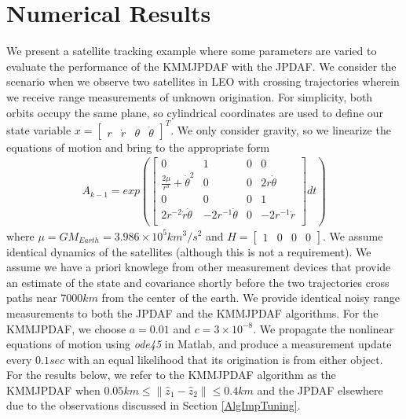 \documentclass[letterpaper, 10pt, conference]{ieeeconf}
\newcommand{\norm}[1]{\ensuremath{\left\| #1 \right\|}}
\begin{document}

\section{Numerical Results}
\label{NumRes}
We present a satellite tracking example where some parameters are varied to evaluate the performance of the KMMJPDAF with the JPDAF. We consider the scenario when we observe two satellites in LEO with crossing trajectories wherein we receive range measurements of unknown origination. For simplicity, both orbits occupy the same plane, so cylindrical coordinates are used to define our state variable $x=\begin{bmatrix} r & \dot r & \theta & \dot \theta\end{bmatrix}^{T}$. We only consider gravity, so we linearize the equations of motion and bring to the appropriate form
\begin{align}
A_{k-1}=
exp\left(\begin{bmatrix}
0 & 1 & 0 & 0 \\
\frac{2\mu}{r^3} +\dot{\theta}^2 & 0 & 0 & 2r\dot{\theta} \\
0 & 0 & 0 & 1 \\
2r^{-2}\dot{r}\dot{\theta} & -2r^{-1}\dot{\theta} & 0 &  -2r^{-1}\dot{r}\\
\end{bmatrix}dt\right)
\end{align}
where $\mu=GM_{Earth}=3.986\times10^5 km^3/s^2$ and $H=\begin{bmatrix} 1 & 0 & 0 & 0\end{bmatrix}$. We assume identical dynamics of the satellites (although this is not a requirement). We assume we have a priori knowlege from other measurement devices that provide an estimate of the state and covariance shortly before the two trajectories cross paths near $7000km$ from the center of the earth. We provide identical noisy range measurements to both the JPDAF and the KMMJPDAF algorithms. For the KMMJPDAF, we choose $a=0.01$ and $c=3\times10^{-8}$. We propagate the nonlinear equations of motion using \emph{ode45} in Matlab, and produce a measurement update every $0.1sec$ with an equal likelihood that its origination is from either object. For the results below, we refer to the KMMJPDAF algorithm as the KMMJPDAF when $0.05km\leq\norm{\hat z_1-\hat z_2}\leq0.4km$ and the JPDAF elsewhere due to the observations discussed in Section \ref{AlgImpTuning}.
\end{document}
